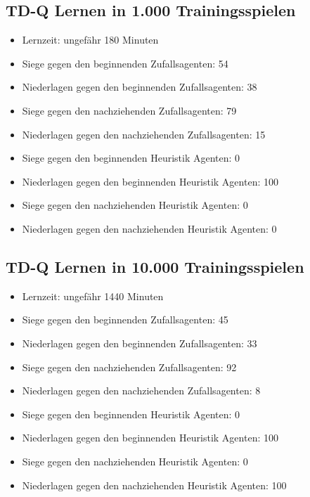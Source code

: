 \subsection{TD-Q Lernen in 1.000 Trainingsspielen}
\begin{itemize}
\item Lernzeit: ungefähr 180 Minuten

\item Siege gegen den beginnenden Zufallsagenten: 54
\item Niederlagen gegen den beginnenden Zufallsagenten: 38

\item Siege gegen den nachziehenden Zufallsagenten: 79
\item Niederlagen gegen den nachziehenden Zufallsagenten: 15

\item Siege gegen den beginnenden Heuristik Agenten: 0
\item Niederlagen gegen den beginnenden Heuristik Agenten: 100

\item Siege gegen den nachziehenden Heuristik Agenten: 0
\item Niederlagen gegen den nachziehenden Heuristik Agenten: 0

\end{itemize}


\subsection{TD-Q Lernen in 10.000 Trainingsspielen}
\begin{itemize}
\item Lernzeit: ungefähr 1440 Minuten

\item Siege gegen den beginnenden Zufallsagenten: 45
\item Niederlagen gegen den beginnenden Zufallsagenten: 33

\item Siege gegen den nachziehenden Zufallsagenten: 92
\item Niederlagen gegen den nachziehenden Zufallsagenten: 8

\item Siege gegen den beginnenden Heuristik Agenten: 0
\item Niederlagen gegen den beginnenden Heuristik Agenten: 100 

\item Siege gegen den nachziehenden Heuristik Agenten: 0
\item Niederlagen gegen den nachziehenden Heuristik Agenten: 100 
\end{itemize}